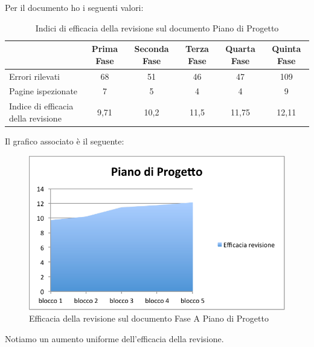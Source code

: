 						Per il documento  ho i seguenti valori:
						\begin{table}[H]\centering
							\begin{tabu}{| l | c | c | c | c | c |}
								\hline
												&Prima Fase 	& Seconda Fase	& Terza Fase	& Quarta Fase 	& Quinta Fase  \\ \hline
												
								Errori rilevati				& 68		& 51 		& 46			& 47 		& 109 	 \\ \hline
								Pagine ispezionate			& 7			& 5 			& 4				& 4	 		& 9	 	  \\ \hline\hline
							
								Indice di efficacia della revisione 	 & 9,71		& 10,2 		& 11,5			& 11,75 		& 12,11 	  \\ \hline
							\end{tabu}
							\caption{Indici di efficacia della revisione sul documento Piano di Progetto}
						\end{table}
						Il grafico associato è il seguente:
						\begin{figure}[H]\centering
							\includegraphics[width=12cm]{PianoDiQualifica/Pics/EfficaciaPdPFaseA.pdf}
							\caption{Efficacia della revisione sul documento Fase A Piano di Progetto}
						\end{figure}
						Notiamo un aumento uniforme dell'efficacia della revisione.
					
